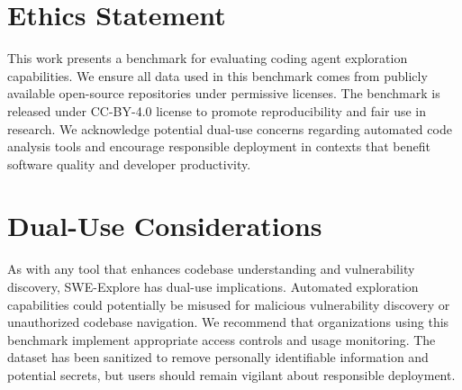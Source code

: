 \documentclass{article}
\newcommand{\todoc}[2]{{\textcolor{#1}{\textbf{[#2]}}}}
\newcommand{\wang}[1]{\todoc{green}{Wang: #1}}
\begin{document}
\begin{abstract}
comparisons (alpha=50 vs alpha=75) using two-sample t-tests with Holm-Bonferroni correction for multiple comparisons. We evaluate exploration along coverage, ranking, and context usage efficiency dimensions, showing that these metrics strongly track downstream repair behavior. Across a broad set of retrieval methods, general coding agents, and specialized localizers, we find that agentic explorers form a clear tier above classical retrieval. While file-level localization is already strong for modern methods, line-level coverage and efficient ranking remain the key axes differentiating state-of-the-art explorers.
\end{abstract}

\section*{Ethics Statement}
This work presents a benchmark for evaluating coding agent exploration capabilities. We ensure all data used in this benchmark comes from publicly available open-source repositories under permissive licenses. The benchmark is released under CC-BY-4.0 license to promote reproducibility and fair use in research. We acknowledge potential dual-use concerns regarding automated code analysis tools and encourage responsible deployment in contexts that benefit software quality and developer productivity.









\appendix



\section*{Dual-Use Considerations}

As with any tool that enhances codebase understanding and vulnerability discovery, SWE-Explore has dual-use implications. Automated exploration capabilities could potentially be misused for malicious vulnerability discovery or unauthorized codebase navigation. We recommend that organizations using this benchmark implement appropriate access controls and usage monitoring. The dataset has been sanitized to remove personally identifiable information and potential secrets, but users should remain vigilant about responsible deployment.
\end{document}
